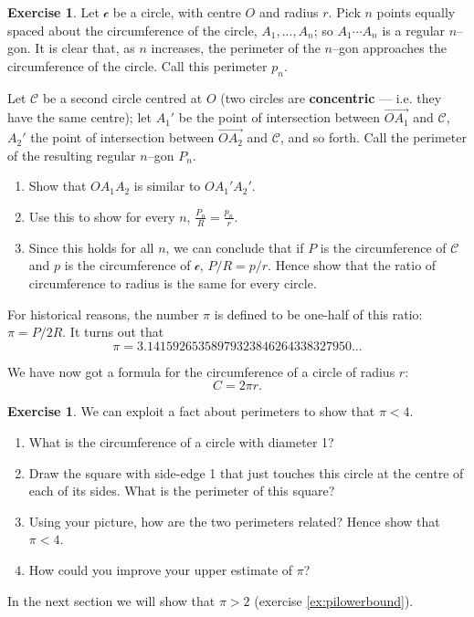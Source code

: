 \documentclass[a4paper]{report}
\theoremstyle{definition}
\newtheorem{exercise}[thm]{Exercise}
\newcommand{\df}[1]{\textbf{#1}\index{#1}}
\newcommand{\ray}{\overrightarrow}
\begin{document}
  \begin{exercise}\label{ex:circumference}
    Let $ \mathscr{c} $ be a circle, with centre $ O $ and radius $ r $. Pick $ n $ points equally spaced
    about the circumference of the circle, $ A_1,...,A_n $; so $ A_1\cdots A_n $ is a regular $ n$--gon.
    It is clear that, as $ n $ increases, the perimeter of the $ n$--gon approaches the circumference
    of the circle. Call this perimeter $ p_n $.

    Let $ \mathscr{C} $ be a second circle centred at $ O $ (two circles are \df{concentric} --- i.e. they
    have the same centre); let $ A_1' $ be the point of intersection between $ \ray{OA_1} $ and $ \mathscr{C} $, $ A_2' $ the
    point of intersection between $ \ray{OA_2} $ and $ \mathscr{C} $, and so forth. Call the perimeter of the resulting
    regular $ n$--gon $ P_n $.

    \begin{enumerate}
      \item Show that $ OA_1A_2 $ is similar to $ O A_1' A_2' $.

      \item Use this to show for every $ n $, $ \frac{P_n}{R} = \frac{p_n}{r} $.

      \item Since this holds for all $ n $, we can conclude that if $ P $ is the circumference of
            $ \mathscr{C} $ and $ p $ is the circumference of $ \mathscr{c} $, $ P/R = p/r $. Hence
            show that the ratio of circumference to radius is the same for every circle.
    \end{enumerate}
  \end{exercise}

  For historical reasons, the number $ \pi $ is defined to be one-half of this ratio: $ \pi = P/2R $. It
  turns out that
  \begin{equation}
    \pi = 3.14159265358979323846264338327950...
  \end{equation}

  We have now got a formula for the circumference of a circle of radius $ r $:
  \begin{equation}
    C = 2\pi r.
  \end{equation}

  \begin{exercise}\label{ex:piupperbound}
    We can exploit a fact about perimeters to show that $ \pi < 4 $.
    \begin{enumerate}
      \item What is the circumference of a circle with diameter 1?
      \item Draw the square with side-edge 1 that just touches this circle at the centre of each
            of its sides. What is the perimeter of this square?
      \item Using your picture, how are the two perimeters related? Hence show that $ \pi < 4 $.
      \item How could you improve your upper estimate of $ \pi $?
    \end{enumerate}
    In the next section we will show that $ \pi > 2 $ (exercise \ref{ex:pilowerbound}).
  \end{exercise}
\end{document}

